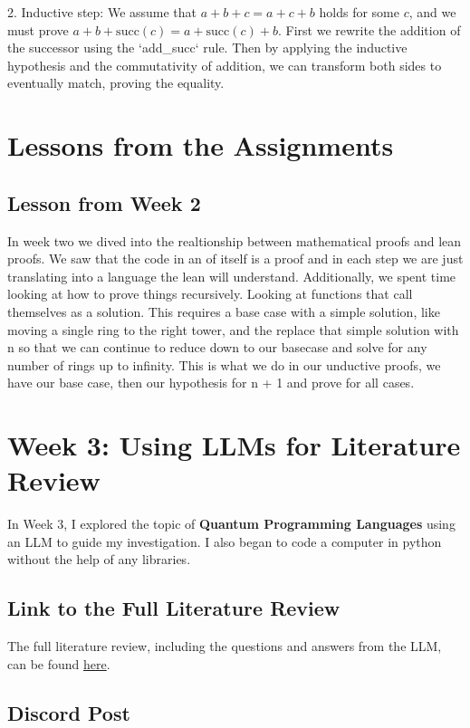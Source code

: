 \documentclass{article}
\begin{document}
2. Inductive step: We assume that \(a + b + c = a + c + b\) holds for some \(c\), and we must prove \(a + b + \text{succ}(c) = a + \text{succ}(c) + b\). First we rewrite the addition of the successor using the `add\_succ` rule. Then by applying the inductive hypothesis and the commutativity of addition, we can transform both sides to eventually match, proving the equality.

\section*{Lessons from the Assignments}
\subsection*{Lesson from Week 2}
In week two we dived into the realtionship between mathematical proofs and lean proofs. We saw that the code in an of itself is a proof and in each step we are just translating into a language the lean will understand. Additionally, we spent time looking at how to prove things recursively. Looking at functions that call themselves as a solution. This requires a base case with a simple solution, like moving a single ring to the right tower, and the replace that simple solution with n so that we can continue to reduce down to our basecase and solve for any number of rings up to infinity. This is what we do in our unductive proofs, we have our base case, then our hypothesis for n + 1 and prove for all cases. 

\section{Week 3: Using LLMs for Literature Review}
\label{sec:week3}


In Week 3, I explored the topic of \textbf{Quantum Programming Languages} using an LLM to guide my investigation. I also began to code a computer in python without the help of any libraries.

\subsection*{Link to the Full Literature Review}
The full literature review, including the questions and answers from the LLM, can be found \href{https://github.com/cgillette25/CPSC-354/blob/main/week3/README.md}{here}.

\subsection*{Discord Post}
\end{document}

